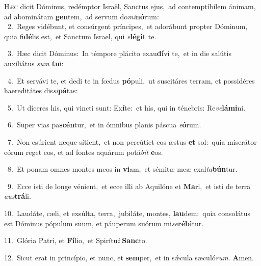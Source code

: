 \lettrine{\initial\textcolor{\initialcolor}{H}}{æc} dicit Dóminus, redémptor Israël, Sanctus ejus,~\dagger ad contemptíbilem ánimam, ad abominátam \textbf{gen}\-tem,~\star ad servum do\-\textit{mi}\-\textbf{nó}rum:\\
{\numbfont\textcolor{\numbcolor}{~2.}}~Reges vidébunt, et consúrgent príncipes,~\dagger et adorábunt propter Dóminum, quia fi\-\textbf{dé}\-lis est,~\star et Sanctum Israel, qui \textit{e}\-\textbf{lé}\textbf{git} te.\par
{\numbfont\textcolor{\numbcolor}{~3.}}~Hæc dicit Dóminus:~\dagger In témpore plácito exau\-\textbf{dí}\-vi te,~\star et in die salútis auxiliátus \textit{sum} \textbf{tu}\-i:\par
{\numbfont\textcolor{\numbcolor}{~4.}}~Et servávi te, et dedi te in fœdus \textbf{pó}\-puli,~\star ut suscitáres terram, et possidéres haereditátes dis\-\textit{si}\-\textbf{pá}tas:\par
{\numbfont\textcolor{\numbcolor}{~5.}}~Ut díceres his, qui vincti sunt: Ex\-\textbf{í}\-te:~\star et his, qui in ténebris: Re\-\textit{ve}\-\textbf{lá}\textbf{mi}ni.\par
{\numbfont\textcolor{\numbcolor}{~6.}}~Super vias pa\-\textbf{scén}\-tur,~\star et in ómnibus planis páscua \textit{e}\-\textbf{ó}rum.\par
{\numbfont\textcolor{\numbcolor}{~7.}}~Non esúrient neque sítient,~\dagger et non percútiet eos æstus \textbf{et} sol:~\star quia miserátor eórum reget eos, et ad fontes aquárum potá\textit{bit} \textbf{e}\-os.\par
{\numbfont\textcolor{\numbcolor}{~8.}}~Et ponam omnes montes meos in \textbf{vi}\-am,~\star et sémitæ meæ exal\-\textit{ta}\-\textbf{bún}tur.\par
{\numbfont\textcolor{\numbcolor}{~9.}}~Ecce isti de longe vénient,~\dagger et ecce illi ab Aquilóne et \textbf{Ma}\-ri,~\star et isti de terra \textit{aus}\-\textbf{trá}li.\par
{\numbfont\textcolor{\numbcolor}{10.}}~Laudáte, cæli, et exsúlta, terra,~\dagger jubiláte, montes, \textbf{lau}\-dem:~\star quia consolátus est Dóminus pópulum suum, et páuperum suórum mi\-\textit{se}\-\textbf{ré}\textbf{bi}tur.\par
{\numbfont\textcolor{\numbcolor}{11.}}~Glória Patri, et \textbf{Fí}\-lio,~\star et Spirítu\textit{i} \textbf{Sanc}\-to.\par
{\numbfont\textcolor{\numbcolor}{12.}}~Sicut erat in princípio, et nunc, et \textbf{sem}\-per,~\star et in sǽcula sæculó\-\textit{rum}\-. \textbf{A}\-men.\par
